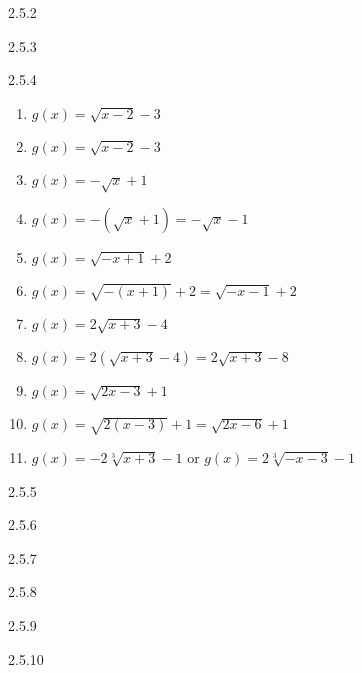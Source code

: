 \begin{Answer}{2.5.2}
\end{Answer}
\begin{Answer}{2.5.3}
\end{Answer}
\begin{Answer}{2.5.4}
	\begin{multicols}{2}
		\begin{enumerate}

			\item  $g(x) = \sqrt{x-2} - 3$
			\item  $g(x) = \sqrt{x-2} - 3$
			\item  $g(x) = -\sqrt{x} + 1$
			\item  $g(x) = -(\sqrt{x} + 1) = -\sqrt{x} - 1$
			\item  $g(x) = \sqrt{-x+1} + 2$
			\item  $g(x) = \sqrt{-(x+1)} + 2 = \sqrt{-x-1} + 2$
			\item  $g(x) = 2\sqrt{x+3} - 4$
			\item  $g(x) = 2\left(\sqrt{x+3} - 4\right) = 2\sqrt{x+3} - 8$
			\item  $g(x) = \sqrt{2x-3} + 1$
			\item  $g(x) = \sqrt{2(x-3)} + 1 = \sqrt{2x-6}+1$
			\item $g(x) = -2\sqrt[3]{x + 3} - 1$ or $g(x) = 2\sqrt[3]{-x - 3} - 1$

		\end{enumerate}
	\end{multicols}
\end{Answer}
\begin{Answer}{2.5.5}

\end{Answer}
\begin{Answer}{2.5.6}
\end{Answer}
\begin{Answer}{2.5.7}
	
\end{Answer}
\begin{Answer}{2.5.8}
	
\end{Answer}
\begin{Answer}{2.5.9}
	
\end{Answer}
\begin{Answer}{2.5.10}
	
\end{Answer}
